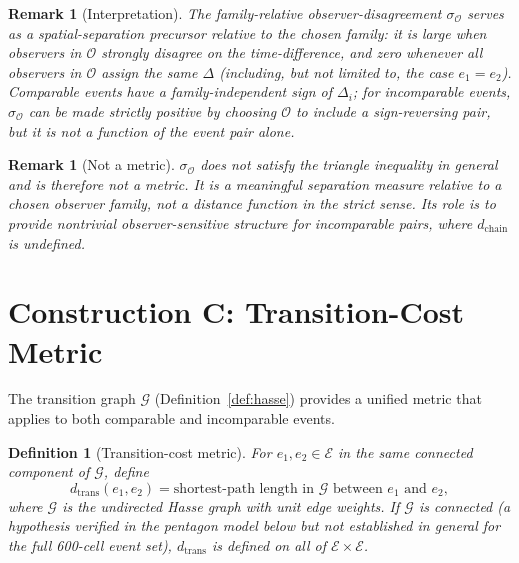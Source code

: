 \documentclass[12pt]{article}
\newtheorem{definition}[theorem]{Definition}
\newtheorem{remark}[theorem]{Remark}
\newcommand{\Ecal}{\mathcal{E}}
\newcommand{\Ocal}{\mathcal{O}}
\newcommand{\Gcal}{\mathcal{G}}
\begin{document}
\begin{remark}[Interpretation]
The family-relative observer-disagreement $\sigma_{\Ocal}$ serves as a \textit{spatial-separation precursor relative to the chosen family}: it is large when observers in $\Ocal$ strongly disagree on the time-difference, and zero whenever all observers in $\Ocal$ assign the same $\Delta$ (including, but not limited to, the case $e_1 = e_2$). Comparable events have a family-independent sign of $\Delta_i$; for incomparable events, $\sigma_{\Ocal}$ can be made strictly positive by choosing $\Ocal$ to include a sign-reversing pair, but it is not a function of the event pair alone.
\end{remark}

\begin{remark}[Not a metric]
$\sigma_{\Ocal}$ does not satisfy the triangle inequality in general and is therefore not a metric. It is a meaningful \textit{separation measure relative to a chosen observer family}, not a distance function in the strict sense. Its role is to provide nontrivial observer-sensitive structure for incomparable pairs, where $d_{\mathrm{chain}}$ is undefined.
\end{remark}

\section{Construction C: Transition-Cost Metric}\label{sec:transition}

The transition graph $\Gcal$ (Definition~\ref{def:hasse}) provides a unified metric that applies to both comparable and incomparable events.

\begin{definition}[Transition-cost metric]\label{def:dtrans}
For $e_1, e_2 \in \Ecal$ in the same connected component of $\Gcal$, define
\begin{equation}\label{eq:dtrans}
    d_{\mathrm{trans}}(e_1, e_2) = \text{shortest-path length in } \Gcal \text{ between } e_1 \text{ and } e_2,
\end{equation}
where $\Gcal$ is the undirected Hasse graph with unit edge weights. If $\Gcal$ is connected (a hypothesis verified in the pentagon model below but not established in general for the full 600-cell event set), $d_{\mathrm{trans}}$ is defined on all of $\Ecal \times \Ecal$.
\end{definition}
\end{document}
